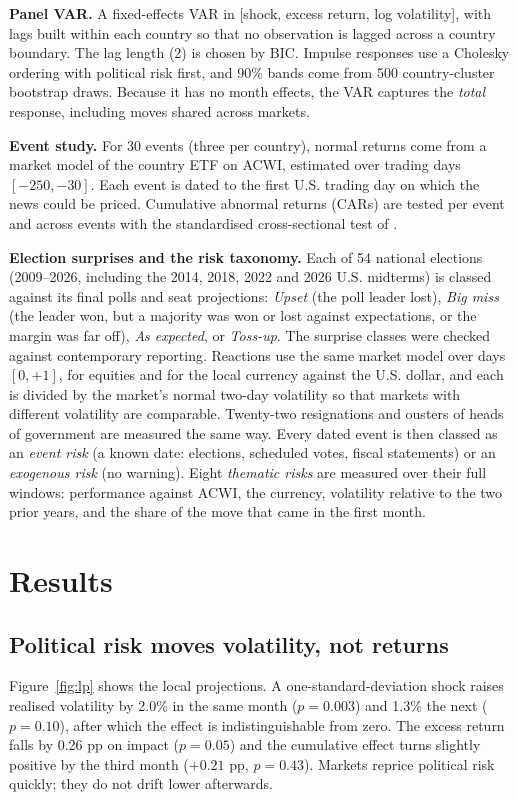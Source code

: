 \documentclass[11pt]{article}
\begin{document}
\textbf{Panel VAR.} A fixed-effects VAR in [shock, excess return, log volatility], with lags built within each country so that no observation is lagged across a country boundary. The lag length (2) is chosen by BIC. Impulse responses use a Cholesky ordering with political risk first, and 90\% bands come from 500 country-cluster bootstrap draws. Because it has no month effects, the VAR captures the \emph{total} response, including moves shared across markets.

\textbf{Event study.} For 30 events (three per country), normal returns come from a market model of the country ETF on ACWI, estimated over trading days $[-250,-30]$. Each event is dated to the first U.S. trading day on which the news could be priced. Cumulative abnormal returns (CARs) are tested per event and across events with the standardised cross-sectional test of \citet{bmp1991}.

\textbf{Election surprises and the risk taxonomy.} Each of 54 national elections (2009--2026, including the 2014, 2018, 2022 and 2026 U.S. midterms) is classed against its final polls and seat projections: \emph{Upset} (the poll leader lost), \emph{Big miss} (the leader won, but a majority was won or lost against expectations, or the margin was far off), \emph{As expected}, or \emph{Toss-up}. The surprise classes were checked against contemporary reporting. Reactions use the same market model over days $[0,+1]$, for equities and for the local currency against the U.S. dollar, and each is divided by the market's normal two-day volatility so that markets with different volatility are comparable. Twenty-two resignations and ousters of heads of government are measured the same way. Every dated event is then classed as an \emph{event risk} (a known date: elections, scheduled votes, fiscal statements) or an \emph{exogenous risk} (no warning). Eight \emph{thematic risks} are measured over their full windows: performance against ACWI, the currency, volatility relative to the two prior years, and the share of the move that came in the first month.

\section{Results}
\subsection{Political risk moves volatility, not returns}
Figure~\ref{fig:lp} shows the local projections. A one-standard-deviation shock raises realised volatility by 2.0\% in the same month ($p = 0.003$) and 1.3\% the next ($p = 0.10$), after which the effect is indistinguishable from zero. The excess return falls by 0.26 pp on impact ($p = 0.05$) and the cumulative effect turns slightly positive by the third month ($+0.21$ pp, $p = 0.43$). Markets reprice political risk quickly; they do not drift lower afterwards.
\end{document}
